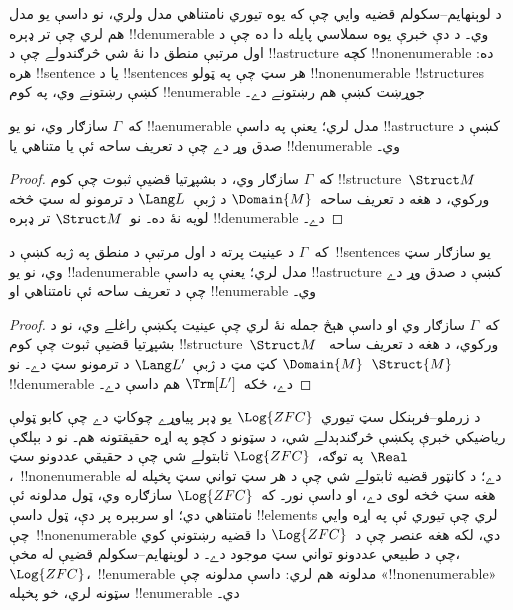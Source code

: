 \documentclass[../../../include/open-logic-section]{subfiles}
\begin{document}

د لوېنهايم--سکولم قضيه وايي چې که يوه تيوري نامتناهي مدل ولري،
نو داسې يو مدل هم لري چې تر ډېره !!{denumerable} وي۔ د دې خبرې يوه
سملاسي پايله دا ده چې د اول مرتبې منطق دا نۀ شي څرګندولے چې د
!!a{structure} کچه !!{nonenumerable} ده: هره !!{sentence} يا د
!!{sentence}s هر سټ چې په ټولو !!{nonenumerable} !!{structure}s
کښې رښتونے وي، په کوم !!{enumerable} جوړښت کښې هم رښتونے دے۔

\begin{thm}
 که~$\Gamma$ سازګار وي، نو يو
!!a{enumerable} مدل لري؛ يعنې په داسې !!a{structure} کښې د صدق وړ
دے چې د تعريف ساحه ئې يا متناهي يا !!{denumerable} وي۔
\end{thm}

\begin{proof}
که~$\Gamma$ سازګار وي، د بشپړتيا قضيې ثبوت چې کوم
!!{structure}~$\Struct M$ ورکوي، د هغه د تعريف ساحه~$\Domain{M}$
د ژبې~$\Lang L$ د ترمونو له سټ څخه لويه نۀ ده۔ نو~$\Struct M$ تر
ډېره !!{denumerable} دے۔
\end{proof}

\begin{thm}
 که~$\Gamma$ د عينيت پرته د اول مرتبې د
منطق په ژبه کښې د~!!{sentence}s يو سازګار سټ وي، نو يو
!!a{denumerable} مدل لري؛ يعنې په داسې !!a{structure} کښې د صدق وړ
دے چې د تعريف ساحه ئې نامتناهي او !!{enumerable} وي۔
\end{thm}

\begin{proof}
که~$\Gamma$ سازګار وي او داسې هېڅ جمله نۀ لري چې عينيت پکښې
راغلے وي، نو د بشپړتيا قضيې ثبوت چې کوم
!!{structure}~$\Struct M$ ورکوي، د هغه د تعريف ساحه~$\Domain{M}$
کټ مټ د ژبې~$\Lang L'$ د ترمونو سټ دے۔ نو~$\Struct{M}$
!!{denumerable} دے، ځکه~$\Trm[L']$ هم داسې دے۔
\end{proof}

\begin{ex}
د زرملو--فرېنکل سټ تيوري~$\Log{ZFC}$ يو ډېر پياوړے چوکاټ دے چې
کابو ټولې رياضيکي خبرې پکښې څرګندېدلے شي، د سټونو د کچو په اړه
حقيقتونه هم۔ نو د بېلګې په توګه،~$\Log{ZFC}$ ثابتولے شي چې د
حقيقي عددونو سټ~$\Real$،~!!{nonenumerable} دے؛ د کانټور قضيه
ثابتولے شي چې د هر سټ تواني سټ پخپله له هغه سټ څخه لوی دے، او داسې
نور۔ که~$\Log{ZFC}$ سازګاره وي، ټول مدلونه ئې نامتناهي دي؛ او
سربېره پر دې، ټول داسې !!{element}s لري چې تيوري ئې په اړه وايي
چې~!!{nonenumerable} دي، لکه هغه عنصر چې د~$\Log{ZFC}$ دا قضيه
رښتونې کوي چې د طبيعي عددونو تواني سټ موجود دے۔ د
لوېنهايم--سکولم قضيې له مخې،~$\Log{ZFC}$،~!!{enumerable} مدلونه هم
لري: داسې مدلونه چې «!!{nonenumerable}» سټونه لري، خو پخپله
!!{enumerable} دي۔
\end{ex}
\end{document}
